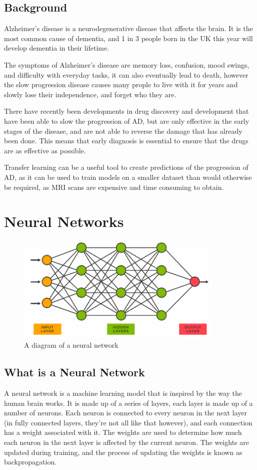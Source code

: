 \documentclass[]{final_report}
\begin{document}
\section{Background}
Alzheimer's disease is a neurodegenerative disease that affects the brain. It is the most common cause of dementia, and 1 in 3 people born in the UK this year will develop dementia in their lifetime.\cite{DementiaStatistics}

The symptoms of Alzheimer's disease are memory loss, confusion, mood swings, and difficulty with everyday tasks, it can also eventually lead to death, however the slow progression disease causes many prople to live with it for years and slowly lose their independence, and forget who they are.

There have recently been developments in drug discovery and development that have been able to slow the progression of AD, but are only effective in the early stages of the disease, and are not able to reverse the damage that has already been done. This means that early diagnosis is essential to ensure that the drugs are as effective as possible.\cite{Van_Dyck2022-pt}

Transfer learning can be a useful tool to create predictions of the progression of AD, as it can be used to train models on a smaller dataset than would otherwise be required, as MRI scans are expensive and time consuming to obtain.

\chapter{Neural Networks}
\begin{figure}[ht!]
  \centering
  \includegraphics[width=100mm]{images/NeuralNetwork.png}
  \caption{A diagram of a neural network \cite{NeuralNetworkDiagram}}
\end{figure}

\section{What is a Neural Network}
A neural network is a machine learning model that is inspired by the way the human brain works.
It is made up of a series of layers, each layer is made up of a number of neurons.
Each neuron is connected to every neuron in the next layer (in fully connected layers, they're not all like that however), and each connection has a weight associated with it.
The weights are used to determine how much each neuron in the next layer is affected by the current neuron.
The weights are updated during training, and the process of updating the weights is known as backpropagation.
\end{document}
